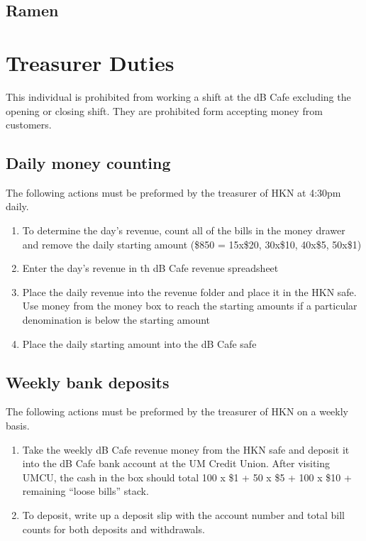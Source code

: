 \documentclass[12pt,onecolumn,letterpaper]{article}
\begin{document}
\subsection{Ramen}

\section{Treasurer Duties}
This individual is prohibited from working a shift at the dB Cafe excluding the opening or closing shift. They are prohibited form accepting money from customers. 
\subsection{Daily money counting}
The following actions must be preformed by the treasurer of HKN at 4:30pm daily. 
\begin{enumerate}
\item To determine the day's revenue, count all of the bills in the money drawer and remove the daily starting amount (\$850 = 15x\$20, 30x\$10, 40x\$5, 50x\$1)
\item Enter the day's revenue in th dB Cafe revenue spreadsheet 
\item Place the daily revenue into the revenue folder and place it in the HKN safe. Use money from the money box to reach the starting amounts if a particular denomination is below the starting amount
\item Place the daily starting amount into the dB Cafe safe
\end{enumerate}
\subsection{Weekly bank deposits}
The following actions must be preformed by the treasurer of HKN on a weekly basis.
\begin{enumerate}
\item Take the weekly dB Cafe revenue money from the HKN safe and deposit it into the dB Cafe bank account at the UM Credit Union. After visiting UMCU, the cash in the box should total 100 x \$1 + 50 x \$5 + 100 x \$10 + remaining ``loose bills'' stack.
\item To deposit, write up a deposit slip with the account number and total bill counts for both deposits and withdrawals.
\end{enumerate}
\end{document}

